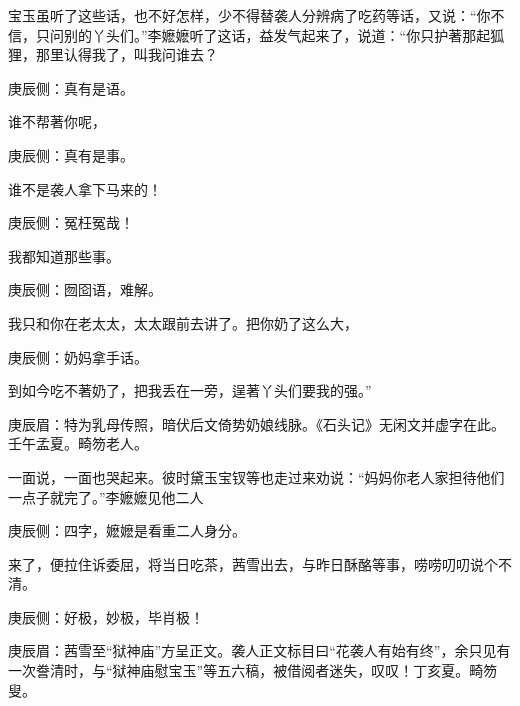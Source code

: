 \begin{parag}
    宝玉虽听了这些话，也不好怎样，少不得替袭人分辨病了吃药等话，又说：“你不信，只问别的丫头们。”李嬷嬷听了这话，益发气起来了，说道：“你只护著那起狐狸，那里认得我了，叫我问谁去？\begin{note}庚辰侧：真有是语。\end{note}谁不帮著你呢，\begin{note}庚辰侧：真有是事。\end{note}谁不是袭人拿下马来的！\begin{note}庚辰侧：冤枉冤哉！\end{note}我都知道那些事。\begin{note}庚辰侧：囫囵语，难解。\end{note}我只和你在老太太，太太跟前去讲了。把你奶了这么大，\begin{note}庚辰侧：奶妈拿手话。\end{note}到如今吃不著奶了，把我丢在一旁，逞著丫头们要我的强。”\begin{note}庚辰眉：特为乳母传照，暗伏后文倚势奶娘线脉。《石头记》无闲文并虚字在此。壬午孟夏。畸笏老人。\end{note}一面说，一面也哭起来。彼时黛玉宝钗等也走过来劝说：“妈妈你老人家担待他们一点子就完了。”李嬷嬷见他二人\begin{note}庚辰侧：四字，嬷嬷是看重二人身分。\end{note}来了，便拉住诉委屈，将当日吃茶，茜雪出去，与昨日酥酪等事，唠唠叨叨说个不清。\begin{note}庚辰侧：好极，妙极，毕肖极！\end{note}\begin{note}庚辰眉：茜雪至“狱神庙”方呈正文。袭人正文标目曰“花袭人有始有终”，余只见有一次誊清时，与“狱神庙慰宝玉”等五六稿，被借阅者迷失，叹叹！丁亥夏。畸笏叟。\end{note}
\end{parag}


